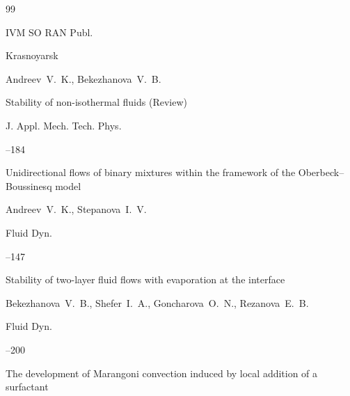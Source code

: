 \begin{thebibliography}{99}

\publ IVM SO RAN Publ.

\publaddr Krasnoyarsk





\by Andreev~V.~K., Bekezhanova~V.~B.

\paper Stability of non-isothermal fluids (Review)

\jour J. Appl. Mech. Tech. Phys.




--184







\paper Unidirectional flows of binary mixtures within the framework of the Oberbeck–Boussinesq model

\by Andreev~V.~K., Stepanova~I.~V.

\jour Fluid Dyn.




--147






\paper Stability of two-layer fluid flows with evaporation at the interface

\by Bekezhanova~V.~B., Shefer~I.~A., Goncharova~O.~N., Rezanova~E.~B.

\jour Fluid Dyn.




--200






\paper The development of Marangoni convection induced by local addition of a surfactant


\end{thebibliography}
